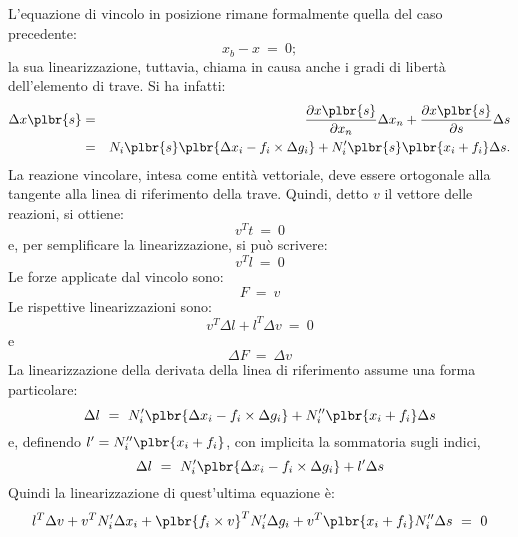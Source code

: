 \documentclass[12pt,dvips,fleqn,italian]{article}
\begin{document}
\noindent
L'equazione di vincolo in posizione rimane formalmente quella del caso
precedente:
\begin{displaymath}
    x_b - x \ = \ 0 ;
\end{displaymath}
la sua linearizzazione, tuttavia, chiama in causa anche i gradi di
libert\`{a} dell'elemento di trave.
Si ha infatti:
\begin{eqnarray*}
    \Delta{x\plbr{s}} & = &
    \frac{\partial{x\plbr{s}}}{\partial{x_n}} \Delta{x_n}
    + \frac{\partial{x\plbr{s}}}{\partial{s}} \Delta{s} \\
    & = &  
    N_i\plbr{s} \plbr{\Delta{x_i} - f_i\times\Delta{g_i}} 
    + N'_i\plbr{s} \plbr{x_i + f_i} \Delta{s} .
\end{eqnarray*}
La reazione vincolare, intesa come entit\`a vettoriale, deve essere 
ortogonale alla tangente alla linea di riferimento della trave.
Quindi, detto $ v $ il vettore delle reazioni, si ottiene:
\begin{displaymath}
    v^T t \ = \ 0
\end{displaymath}
e, per semplificare la linearizzazione, si pu\`o scrivere:
\begin{displaymath}
    v^T l \ = \ 0
\end{displaymath}
Le forze applicate dal vincolo sono:
\begin{displaymath}
    F \ = \ v
\end{displaymath}
Le rispettive linearizzazioni sono:
\begin{displaymath}
    v^T \Delta{l} + l^T \Delta{v} \ = \ 0
\end{displaymath}
e
\begin{displaymath}
    \Delta{F} \ = \ \Delta{v}
\end{displaymath}
La linearizzazione della derivata della linea di riferimento assume 
una forma particolare:
\begin{displaymath}
    \Delta{l} \ = \ N'_i\plbr{\Delta{x_i} - f_i\times\Delta{g_i}}
    + N''_i\plbr{x_i + f_i} \Delta{s}
\end{displaymath}
e, definendo $l'=N''_i\plbr{x_i + f_i}$, con implicita la sommatoria 
sugli indici,
\begin{displaymath}
    \Delta{l} \ = \ N'_i\plbr{\Delta{x_i} - f_i\times\Delta{g_i}}
    + l' \Delta{s}
\end{displaymath}
Quindi la linearizzazione di quest'ultima equazione \`e:
\begin{displaymath}
	l^T \Delta{v} 
	+ v^T N'_i \Delta{x_i} 
	+ \plbr{f_i\times{v}}^T N'_i \Delta{g_i}
	+ v^T \plbr{x_i + f_i} N''_i \Delta{s}
	\ = \ 0
\end{displaymath}
\end{document}
